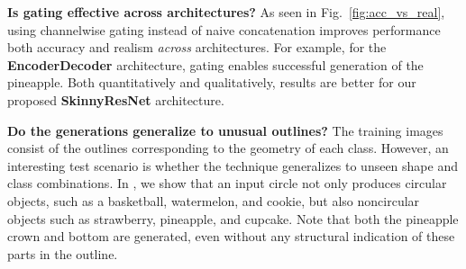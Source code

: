 \vspace{2mm} \noindent \textbf{Is gating effective across architectures?} 
As seen in Fig.~\ref{fig:acc_vs_real}, using channelwise gating instead of naive concatenation improves performance both accuracy and realism \textit{across} architectures. For example, for the \textbf{EncoderDecoder} architecture, gating enables successful generation of the pineapple.
Both quantitatively and qualitatively, results are better for our proposed \textbf{SkinnyResNet} architecture.


\vspace{2mm} \noindent \textbf{Do the generations generalize to unusual outlines?} The training images consist of the outlines corresponding to the geometry of each class. However, an interesting test scenario is whether the technique generalizes to unseen shape and class combinations. In , we show that an input circle not only produces circular objects, such as a basketball, watermelon, and cookie, but also noncircular objects such as strawberry, pineapple, and cupcake. Note that both the pineapple crown and bottom are generated, even without any structural indication of these parts in the outline.



